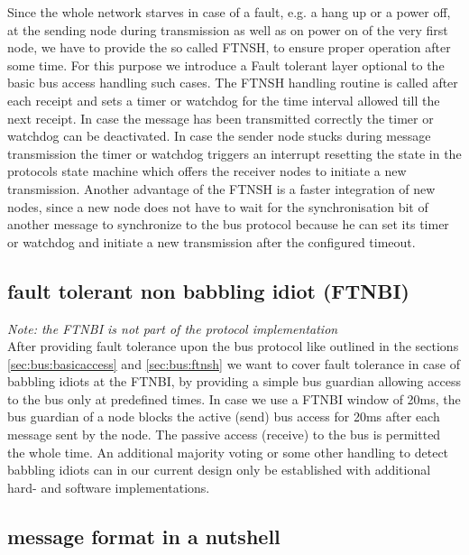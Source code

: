 \documentclass[11pt,a4paper,oneside]{report}
\begin{document}
Since the whole network starves in case of a fault, e.g. a hang up or a power off, at the sending node during transmission as well as on power on of the very first node, we have to provide the so called FTNSH, to ensure proper operation after some time.
For this purpose we introduce a Fault tolerant layer optional to the basic bus access handling such cases. The FTNSH handling routine is called after each receipt and sets a timer or watchdog for the time interval allowed till the next receipt.
In case the message has been transmitted correctly the timer or watchdog can be deactivated.
In case the sender node stucks during message transmission the timer or watchdog triggers an interrupt resetting the state in the protocols state machine which offers the receiver nodes to initiate a new transmission.
Another advantage of the FTNSH is a faster integration of new nodes, since a new node does not have to wait for the synchronisation bit of another message to synchronize to the bus protocol because he can set its timer or watchdog and initiate a new transmission after the configured timeout.

\subsection {fault tolerant non babbling idiot (FTNBI)}
\label{sec:bus:ftnbi}

\textit{Note: the FTNBI is not part of the protocol implementation}\\

After providing fault tolerance upon the bus protocol like outlined in the sections \ref{sec:bus:basicaccess} and \ref{sec:bus:ftnsh} we want to cover fault tolerance in case of babbling idiots at the FTNBI, by providing a simple bus guardian allowing access to the bus only at predefined times.
In case we use a FTNBI window of 20ms, the bus guardian of a node blocks the active (send) bus access for 20ms after each message sent by the node. The passive access (receive) to the bus is permitted the whole time. An additional majority voting or some other handling to detect babbling idiots can in our current design only be established with additional hard- and software implementations.


\subsection{message format in a nutshell}
\label{sec:bus:messageformat}


\end{document}

